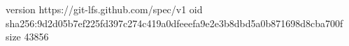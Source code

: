 version https://git-lfs.github.com/spec/v1
oid sha256:9d2d05b7ef225fd397c274c419a0dfeeefa9e2e3b8dbd5a0b871698d8cba700f
size 43856
